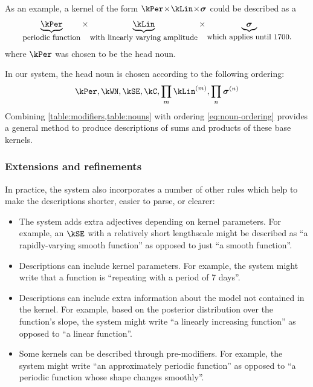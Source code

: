 As an example, a kernel of the form $\kPer \kerntimes  \kLin \kerntimes \boldsymbol{\sigma}$ could be described as a
\begin{align*}
\underbrace{\kPer}_{\textnormal{\small periodic function}} \times 
\underbrace{\kLin}_{\textnormal{\small with linearly varying amplitude}} \times 
\underbrace{\boldsymbol{\sigma}}_{\textnormal{\small which applies until 1700.}}
\end{align*}
where $\kPer$ was chosen to be the head noun.

In our system, the head noun is chosen according to the following ordering:
\begin{align}
\kPer, \kWN, \kSE, \kC, \prod_m \kLin^{(m)}, \prod_n \boldsymbol\sigma^{(n)}
\label{eq:noun-ordering}
\end{align}
Combining \cref{table:modifiers,table:nouns} with ordering \ref{eq:noun-ordering} provides a general method to produce descriptions of sums and products of these base kernels.


\subsubsection{Extensions and refinements}
In practice, the system also incorporates a number of other rules which help to make the descriptions shorter, easier to parse, or clearer:
\begin{itemize}
  \item The system adds extra adjectives depending on kernel parameters.
        For example, an $\kSE$ with a relatively short lengthscale might be described as ``a rapidly-varying smooth function'' as opposed to just ``a smooth function''.
  \item Descriptions can include kernel parameters.
        For example, the system might write that a function is ``repeating with a period of 7 days''.
  \item Descriptions can include extra information about the model not contained in the kernel.
        For example, based on the posterior distribution over the function's slope, the system might write ``a linearly increasing function'' as opposed to ``a linear function''.
  \item Some kernels can be described through pre-modifiers.
        For example, the system might write ``an approximately periodic function'' as opposed to ``a periodic function whose shape changes smoothly''.
\end{itemize}

